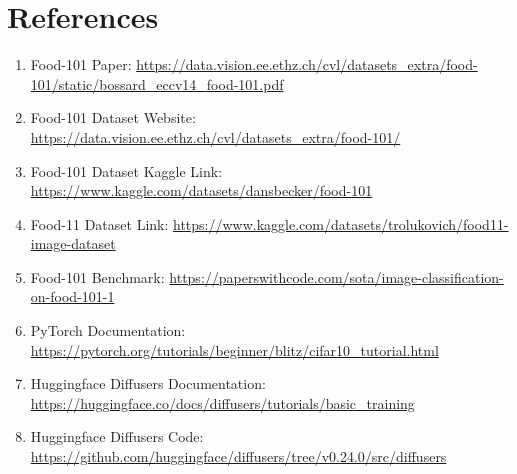 \documentclass{article}
\begin{document}
\section{References}

\begin{enumerate}
    \item Food-101 Paper: \small{\url{https://data.vision.ee.ethz.ch/cvl/datasets_extra/food-101/static/bossard_eccv14_food-101.pdf}}
    \item Food-101 Dataset Website: \small{\url{https://data.vision.ee.ethz.ch/cvl/datasets_extra/food-101/}}
    \item Food-101 Dataset Kaggle Link: \small{\url{https://www.kaggle.com/datasets/dansbecker/food-101}}
    \item Food-11 Dataset Link: \small{\url{https://www.kaggle.com/datasets/trolukovich/food11-image-dataset}}
    \item Food-101 Benchmark: \small{\url{https://paperswithcode.com/sota/image-classification-on-food-101-1}}
    \item PyTorch Documentation: \small{\url{https://pytorch.org/tutorials/beginner/blitz/cifar10_tutorial.html}}
    \item Huggingface Diffusers Documentation: \small{\url{https://huggingface.co/docs/diffusers/tutorials/basic_training}}
    \item Huggingface Diffusers Code: \small{\url{https://github.com/huggingface/diffusers/tree/v0.24.0/src/diffusers}}
\end{enumerate}
\end{document}
